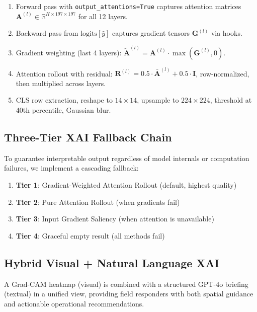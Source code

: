 \documentclass[journal]{IEEEtran}
\begin{document}
\begin{enumerate}
    \item Forward pass with \texttt{output\_attentions=True} captures attention matrices $\mathbf{A}^{(l)} \in \mathbb{R}^{H \times 197 \times 197}$ for all 12 layers.
    \item Backward pass from $\text{logits}[\hat{y}]$ captures gradient tensors $\mathbf{G}^{(l)}$ via hooks.
    \item Gradient weighting (last 4 layers): $\tilde{\mathbf{A}}^{(l)} = \mathbf{A}^{(l)} \cdot \max(\mathbf{G}^{(l)}, 0)$.
    \item Attention rollout with residual: $\mathbf{R}^{(l)} = 0.5 \cdot \bar{\mathbf{A}}^{(l)} + 0.5 \cdot \mathbf{I}$, row-normalized, then multiplied across layers.
    \item CLS row extraction, reshape to $14 \times 14$, upsample to $224 \times 224$, threshold at 40th percentile, Gaussian blur.
\end{enumerate}

\subsection{Three-Tier XAI Fallback Chain}

To guarantee interpretable output regardless of model internals or computation failures, we implement a cascading fallback:

\begin{enumerate}
    \item \textbf{Tier 1}: Gradient-Weighted Attention Rollout (default, highest quality)
    \item \textbf{Tier 2}: Pure Attention Rollout (when gradients fail)
    \item \textbf{Tier 3}: Input Gradient Saliency (when attention is unavailable)
    \item \textbf{Tier 4}: Graceful empty result (all methods fail)
\end{enumerate}

\subsection{Hybrid Visual + Natural Language XAI}

A Grad-CAM heatmap (visual) is combined with a structured GPT-4o briefing (textual) in a unified view, providing field responders with both spatial guidance and actionable operational recommendations.

\end{document}

